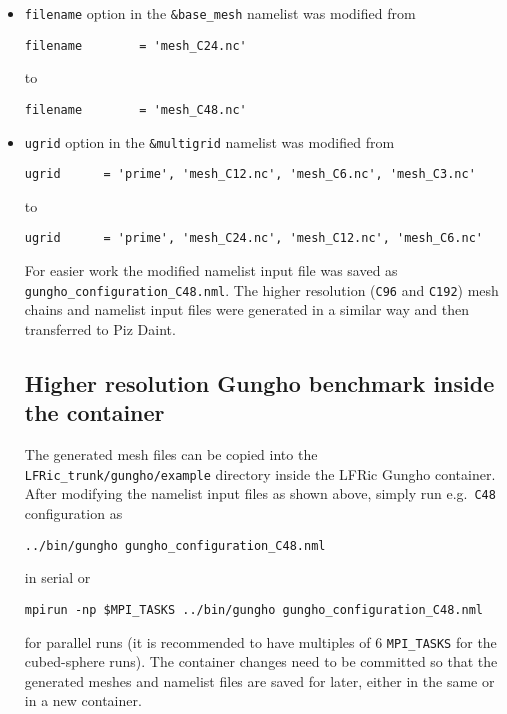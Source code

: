 \documentclass[twoside,a4paper,12pt]{article}
\begin{document}
\begin{itemize}

\item \texttt{filename} option in the \texttt{\&base\_mesh} namelist was modified from
\begin{Verbatim}[fontsize=\small]
filename        = 'mesh_C24.nc'
\end{Verbatim}
to
\begin{Verbatim}[fontsize=\small]
filename        = 'mesh_C48.nc'
\end{Verbatim}

\item \texttt{ugrid} option in the \texttt{\&multigrid} namelist was modified from
\begin{Verbatim}[fontsize=\small]
ugrid      = 'prime', 'mesh_C12.nc', 'mesh_C6.nc', 'mesh_C3.nc'
\end{Verbatim}
to
\begin{Verbatim}[fontsize=\small]
ugrid      = 'prime', 'mesh_C24.nc', 'mesh_C12.nc', 'mesh_C6.nc'
\end{Verbatim}
For easier work the modified namelist input file was saved as \newline
\texttt{gungho\_configuration\_C48.nml}. The higher resolution (\texttt{C96} and
\texttt{C192}) mesh chains and namelist input files were generated in a similar
way and then transferred to Piz Daint.
%
%
\subsection{Higher resolution Gungho benchmark inside the container}\label{lfric_container_high}

The generated mesh files can be copied into the \texttt{LFRic\_trunk/gungho/example}
directory inside the LFRic Gungho container. After modifying the namelist input
files as shown above, simply run e.g.\ \texttt{C48} configuration as
\begin{Verbatim}[fontsize=\small]
../bin/gungho gungho_configuration_C48.nml
\end{Verbatim}
in serial or
\begin{Verbatim}[fontsize=\small]
mpirun -np $MPI_TASKS ../bin/gungho gungho_configuration_C48.nml
\end{Verbatim}
for parallel runs (it is recommended to have multiples of 6 \texttt{MPI\_TASKS}
for the cubed-sphere runs). The container changes need to be committed so that
the generated meshes and namelist files are saved for later, either in the same
or in a new container.

\end{itemize}
\end{document}
